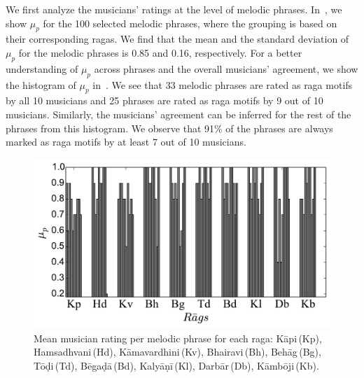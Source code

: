 {

We first analyze the musicians' ratings at the level of melodic phrases. In~, we show $\mu_p$ for the 100 selected melodic phrases, where the grouping is based on their corresponding \glspl{raga}. We find that the mean and the standard deviation of $\mu_p$ for the melodic phrases is 0.85 and 0.16, respectively. For a better understanding of $\mu_p$ across phrases and the overall musicians' agreement, we show the histogram of $\mu_p$ in~. We see that 33 melodic phrases are rated as \gls{raga} motifs by all 10 musicians and 25 phrases are rated as \gls{raga} motifs by 9 out of 10 musicians. Similarly, the musicians' agreement can be inferred for the rest of the phrases from this histogram. We observe that 91\% of the phrases are always marked as \gls{raga} motifs by at least 7 out of 10 musicians. 


\begin{figure}
	\begin{center}
		\includegraphics[width=\figSizeEighty]{ch06_patterns/figures/Characterization/per_raaga_per_phrase_rating.pdf}
	\end{center}
	\caption{Mean musician rating per melodic phrase for each \gls{raga}: K\={a}pi\,(Kp), Hamsadhvani\,(Hd), K\={a}mavardhini\,(Kv), Bhairavi\,(Bh), Beh\={a}g\,(Bg), T\={o}\d{d}i\,(Td), B\={e}ga\d{d}\={a}\,(Bd), Kaly\={a}\d{n}\={i}\,(Kl), Darb\={a}r\,(Db), K\={a}mb\={o}ji\,(Kb).}
	\label{fig:average_rating_pattern_characterization}
\end{figure}


}
